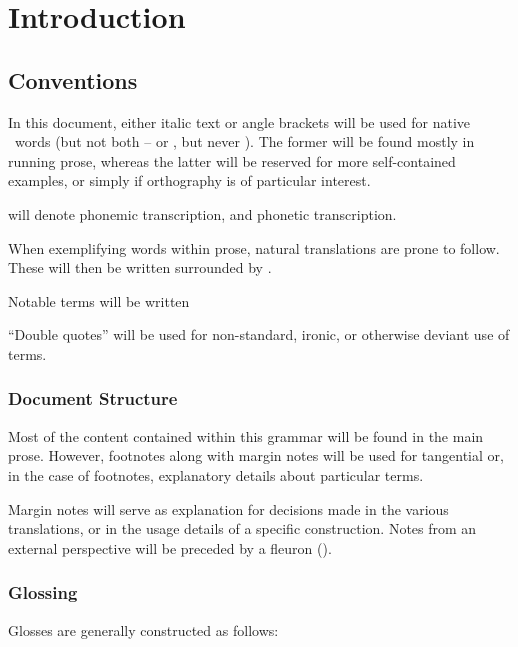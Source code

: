 \chapter{Introduction}\label{ch:introduction}
\section{Conventions}\label{sec:conventions}
In this document, either italic text or angle brackets will be used for native \langname\ words (but not both --  or , but never ).
The former will be found mostly in running prose, whereas the latter will be reserved for more self-contained examples, or simply if orthography is of particular interest.

 will denote phonemic transcription, and  phonetic transcription.

When exemplifying words within prose, natural translations are prone to follow. These will then be written surrounded by .

Notable terms will be written 

``Double quotes'' will be used for non-standard, ironic, or otherwise deviant use of terms.

\subsection{Document Structure}
Most of the content contained within this grammar will be found in the main prose. However, footnotes along with margin notes will be used for tangential or, in the case of footnotes, explanatory details about particular terms.
%
%

Margin notes will serve as explanation for decisions made in the various translations, or in the usage details of a specific construction.
Notes from an external perspective will be preceded by a fleuron (\fleuron).

\subsection{Glossing}\label{sec:conventions-gloss}
Glosses are generally constructed as follows:

